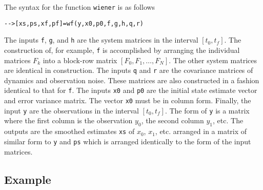 	The syntax for the function {\tt wiener} is as follows
\begin{verbatim}
-->[xs,ps,xf,pf]=wf(y,x0,p0,f,g,h,q,r)
\end{verbatim}
The inputs 
{\tt f}, {\tt g}, and {\tt h} are the system matrices in the interval 
$[t_0,t_f]$.  The construction of, for example, {\tt f} is accomplished
by arranging the individual matrices $F_k$ into a block-row matrix
$[F_0,F_1,\ldots,F_N]$.  The other system matrices are identical in
construction.  The inputs {\tt q} and {\tt r}
are the covariance matrices of dynamics and observation noise.  These
matrices are also constructed in a fashion identical to that for {\tt f}.
The inputs {\tt x0} and {\tt p0} are the initial state estimate vector
and error variance matrix.  The vector {\tt x0} must be in column form.
Finally, the input {\tt y} are the observations in the interval $[t_0,t_f]$.
The form of {\tt y} is a matrix where the first column is the observation
$y_0$, the second column $y_1$, etc.  The outputs are the smoothed
estimates {\tt xs} of $x_0$, $x_1$, etc. arranged in a matrix of similar form
to {\tt y} and {\tt ps} which is arranged identically to the form
of the input matrices.

\subsection{Example}

